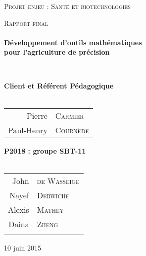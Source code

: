 \begin{titlepage}
\begin{center}


\vfill 

\textsc{\Large Projet enjeu : Santé et biotechnologies}\\[0.5cm]

\vfill

\textsc{\Large Rapport final}\\[1.5cm] 

\HRule \\[0.4cm]
{ \LARGE \bfseries Développement d'outils mathématiques \\ 
   pour l'agriculture de précision \\[0.4cm] }

\HRule \\[1.5cm]

\vfill

{\large
\begin{center}
  \textbf{Client et Référent Pédagogique} \\~\\
\begin{tabular}{rl}
   \quad Pierre &\textsc{Carmier} \\
    \quad Paul-Henry &\textsc{Courn\`ede} \\
  
\end{tabular}
\end{center}
\vfill
\begin{center}
  \textbf{P2018 : groupe SBT-11} \\~\\
  
\begin{tabular}{rl}

    \quad John &\textsc{de Wasseige} \\
    \quad Nayef &\textsc{Derwiche} \\
    \quad Alexis &\textsc{Mathey} \\
    \quad Daina &\textsc{Zheng} \\ \\
\end{tabular}
\end{center}
}

\vfill

{\large 10 juin 2015}

\end{center}
\end{titlepage}